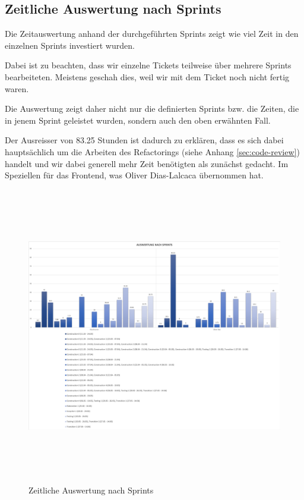 \subsection{Zeitliche Auswertung nach Sprints}
Die Zeitauswertung anhand der durchgeführten Sprints zeigt wie viel Zeit in den einzelnen Sprints investiert wurden.

Dabei ist zu beachten, dass wir einzelne Tickets teilweise über mehrere Sprints bearbeiteten. Meistens geschah dies, weil wir mit dem Ticket noch nicht fertig waren.

Die Auswertung zeigt daher nicht nur die definierten Sprints bzw. die Zeiten, die in jenem Sprint geleistet wurden, sondern auch den oben erwähnten Fall.

Der Ausreisser von 83.25 Stunden ist dadurch zu erklären, dass es sich dabei hauptsächlich um die Arbeiten des Refactorings (siehe Anhang \ref{sec:code-review}) handelt und wir dabei generell mehr Zeit benötigten als zunächst gedacht. Im Speziellen für das Frontend, was Oliver Dias-Lalcaca übernommen hat.

\begin{figure}[h]
  \centering
  \includegraphics[width=1\linewidth, height=13cm]{./img/zeitauswertung/ZeitauswertungSprints}
  \caption{Zeitliche Auswertung nach Sprints}
  \label{fig:comparison-sprints}
\end{figure}

